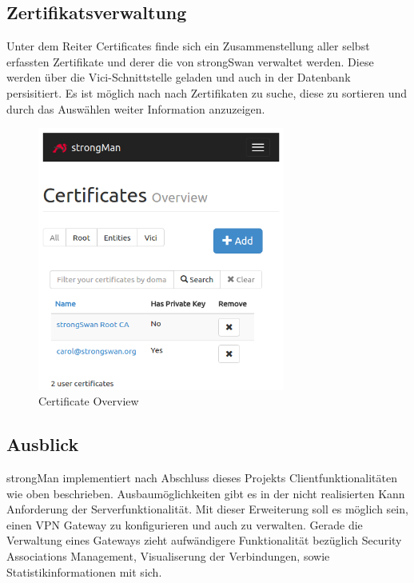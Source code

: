 \noindent\begin{minipage}[t]{0.5\textwidth}
\vspace{0pt}
\subsection{Zertifikatsverwaltung}
Unter dem Reiter Certificates finde sich ein Zusammenstellung aller selbst erfassten Zertifikate und derer die von strongSwan verwaltet werden. Diese werden über die Vici-Schnittstelle geladen und auch in der Datenbank persisitiert. Es ist möglich nach nach Zertifikaten zu suche, diese zu sortieren und durch das Auswählen weiter Information anzuzeigen.
\end{minipage}
\hfill
\begin{minipage}[t]{0.5\textwidth}
\vspace{0pt}
    \begin{figure}[H]
    	\centering
    	\includegraphics[width=230pt]{images/certificate_overview.png}
    	\caption{Certificate Overview}
    \end{figure}
\end{minipage}
\newpage

\subsection{Ausblick}
strongMan implementiert nach Abschluss dieses Projekts Clientfunktionalitäten wie oben beschrieben. Ausbaumöglichkeiten gibt es in der nicht realisierten Kann Anforderung der Serverfunktionalität. Mit dieser Erweiterung soll es möglich sein, einen VPN Gateway zu konfigurieren und auch zu verwalten. Gerade die Verwaltung eines Gateways zieht aufwändigere Funktionalität bezüglich Security Associations Management, Visualiserung der Verbindungen, sowie Statistikinformationen mit sich.\\ 


